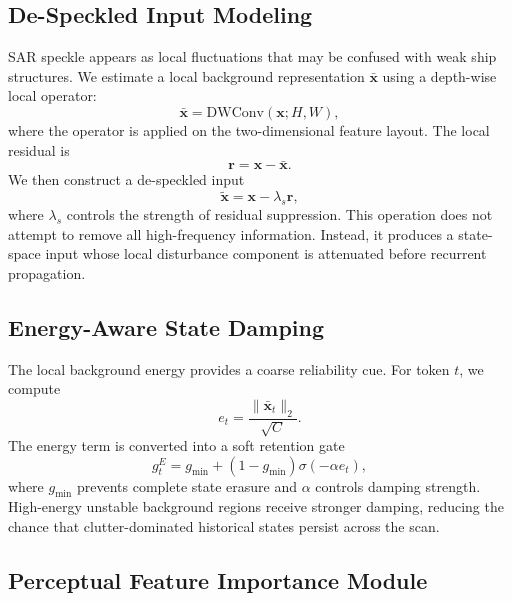 \documentclass[10pt]{article}
\begin{document}
\subsection{De-Speckled Input Modeling}

SAR speckle appears as local fluctuations that may be confused with weak ship structures. We estimate a local background representation $\bar{\mathbf{x}}$ using a depth-wise local operator:
\begin{equation}
  \bar{\mathbf{x}} = \mathrm{DWConv}(\mathbf{x}; H,W),
\end{equation}
where the operator is applied on the two-dimensional feature layout. The local residual is
\begin{equation}
  \mathbf{r} = \mathbf{x}-\bar{\mathbf{x}}.
\end{equation}
We then construct a de-speckled input
\begin{equation}
  \widetilde{\mathbf{x}} = \mathbf{x} - \lambda_s \mathbf{r},
  \label{eq:debiased}
\end{equation}
where $\lambda_s$ controls the strength of residual suppression. This operation does not attempt to remove all high-frequency information. Instead, it produces a state-space input whose local disturbance component is attenuated before recurrent propagation.

\subsection{Energy-Aware State Damping}

The local background energy provides a coarse reliability cue. For token $t$, we compute
\begin{equation}
  e_t = \frac{\|\bar{\mathbf{x}}_t\|_2}{\sqrt{C}}.
\end{equation}
The energy term is converted into a soft retention gate
\begin{equation}
  g^{E}_t = g_{\min} + (1-g_{\min})\sigma(-\alpha e_t),
\end{equation}
where $g_{\min}$ prevents complete state erasure and $\alpha$ controls damping strength. High-energy unstable background regions receive stronger damping, reducing the chance that clutter-dominated historical states persist across the scan.

\subsection{Perceptual Feature Importance Module}
\end{document}
